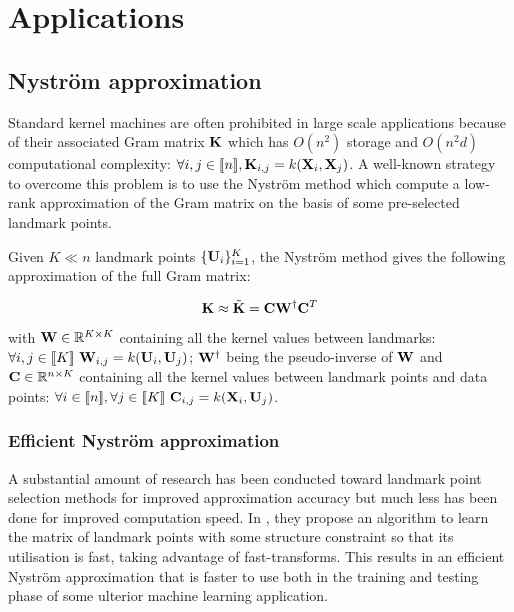 \section{Applications}
\label{sec:uses}

\subsection{Nyström approximation}

Standard kernel machines are often prohibited in large scale applications because of their associated Gram matrix ${\mathbf{K}}$ which has $O(n^2)$ storage and $O(n^2d)$ computational complexity: $\forall i,j \in [\![n]\!], {\mathbf{K}}_{i,j} = k({\mathbf{X}}_i, {\mathbf{X}}_j)$. A well-known strategy to overcome this problem is to use the Nyström method which compute a low-rank approximation of the Gram matrix on the basis of some pre-selected landmark points. 

Given $K \ll n$ landmark points $\{{\mathbf{U}}_i\}_{i=1}^{K}$, the Nyström method gives the following approximation of the full Gram matrix:

\begin{equation}
 \label{eq:nystrom}
 {\mathbf{K}} \approx \tilde{{\mathbf{K}}} = {\mathbf{C}}{\mathbf{W}}^\dagger{\mathbf{C}}^T
\end{equation}

with ${\mathbf{W}} \in \mathbb{R}^{K \times K}$ containing all the kernel values between landmarks: $\forall i,j \in [\![K]\!]~ {\mathbf{W}}_{i,j} = k({\mathbf{U}}_i, {\mathbf{U}}_j)$; ${\mathbf{W}}^\dagger$ being the pseudo-inverse of ${\mathbf{W}}$ and ${\mathbf{C}} \in \mathbb{R}^{n \times K}$ containing all the kernel values between landmark points and data points: $\forall i \in [\![n]\!], \forall j \in [\![K]\!]~ {\mathbf{C}}_{i, j} = k({\mathbf{X}}_i, {\mathbf{U}}_j)$.

\subsubsection{Efficient Nyström approximation}

A substantial amount of research has been conducted toward landmark point selection methods for improved approximation accuracy \cite{kumar2012sampling} \cite{musco2017recursive} but much less has been done for improved computation speed. In \cite{si2016computationally}, they propose an algorithm to learn the matrix of landmark points with some structure constraint so that its utilisation is fast, taking advantage of fast-transforms. This results in an efficient Nyström approximation that is faster to use both in the training and testing phase of some ulterior machine learning application.

